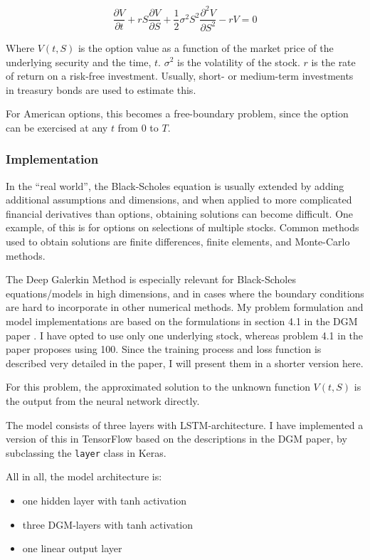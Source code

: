 \documentclass[]{article}
\providecommand{\tightlist}{%
  \setlength{\itemsep}{0pt}\setlength{\parskip}{0pt}}
\begin{document}
\[\frac{\partial V}{\partial t} + rS\frac{\partial V}{\partial S} + \frac{1}{2}\sigma^2 S^2\frac{\partial^2 V}{\partial S^2} - rV = 0\]

Where \(V(t, S)\) is the option value as a function of the market price
of the underlying security and the time, \(t\). \(\sigma^2\) is the
volatility of the stock. \(r\) is the rate of return on a risk-free
investment. Usually, short- or medium-term investments in treasury bonds
are used to estimate this.

For American options, this becomes a free-boundary problem, since the
option can be exercised at any \(t\) from \(0\) to \(T\).

\subsubsection{Implementation}\label{implementation-2}

In the ``real world'', the Black-Scholes equation is usually extended by
adding additional assumptions and dimensions, and when applied to more
complicated financial derivatives than options, obtaining solutions can
become difficult. One example, of this is for options on selections of
multiple stocks. Common methods used to obtain solutions are finite
differences, finite elements, and Monte-Carlo methods.

The Deep Galerkin Method is especially relevant for Black-Scholes
equations/models in high dimensions, and in cases where the boundary
conditions are hard to incorporate in other numerical methods. My
problem formulation and model implementations are based on the
formulations in section 4.1 in the DGM paper \citep{Sirignano_2018}. I
have opted to use only one underlying stock, whereas problem 4.1 in the
paper proposes using 100. Since the training process and loss function
is described very detailed in the paper, I will present them in a
shorter version here.

For this problem, the approximated solution to the unknown function
\(V(t, S)\) is the output from the neural network directly.

The model consists of three layers with LSTM-architecture. I have
implemented a version of this in TensorFlow based on the descriptions in
the DGM paper, by subclassing the \texttt{layer} class in Keras.

All in all, the model architecture is:

\begin{itemize}
\tightlist
\item
  one hidden layer with tanh activation
\item
  three DGM-layers with tanh activation
\item
  one linear output layer
\end{itemize}
\end{document}
